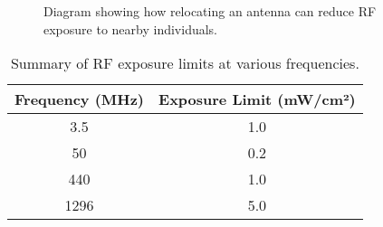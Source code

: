 \begin{figure}[h!]
    \centering
    \caption{Diagram showing how relocating an antenna can reduce RF exposure to nearby individuals.}
    \label{fig:antenna_relocation}
\end{figure}

\begin{table}[h!]
    \centering
    \begin{tabular}{|c|c|}
        \hline
        \textbf{Frequency (MHz)} & \textbf{Exposure Limit (mW/cm²)} \\
        \hline
        3.5 & 1.0 \\
        50 & 0.2 \\
        440 & 1.0 \\
        1296 & 5.0 \\
        \hline
    \end{tabular}
    \caption{Summary of RF exposure limits at various frequencies.}
    \label{tab:rf_exposure_limits}
\end{table}
